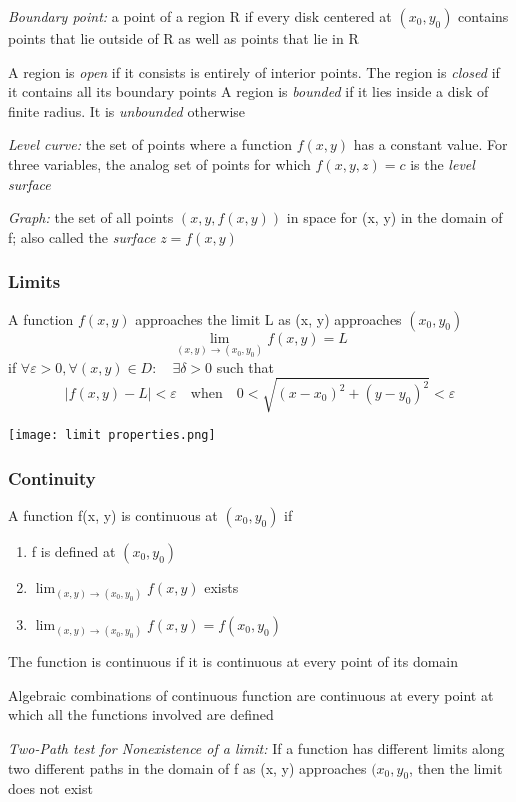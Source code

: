 \documentclass[12pt]{article}
\begin{document}
\emph{Boundary point:} a point of a region R if every disk centered at $(x_0, y_0)$ contains points that lie outside of R as well as points that lie in R

A region is \emph{open} if it consists is entirely of interior points. The region is \emph{closed} if it contains all its boundary points
A region is \emph{bounded} if it lies inside a disk of finite radius. It is \emph{unbounded} otherwise

\emph{Level curve:} the set of points where a function $f(x, y)$ has a constant value. For three variables, the analog set of points for which $f(x, y, z) = c$ is the \emph{level surface}

\emph{Graph:} the set of all points $(x, y, f(x, y))$ in space for (x, y) in the domain of f; also called the \emph{surface} $z = f(x, y)$

\subsubsection{Limits}
A function $f(x, y)$ approaches the limit L as (x, y) approaches $(x_0, y_0)$
\[ \lim_{(x, y) \to (x_0, y_0)} f(x,y) = L\]
if $\forall \varepsilon > 0, \forall (x, y) \in D: \quad \exists \delta > 0$ such that 
\[ |f(x,y) - L| < \varepsilon \quad \text{when} \quad 0 < \sqrt{(x - x_0)^2 + (y - y_0)^2} < \varepsilon\]

\texttt{[image: limit properties.png]}

\subsubsection{Continuity}
A function f(x, y) is continuous at $(x_0, y_0)$ if 
\begin{enumerate}
    \item f is defined at $(x_0, y_0)$
    \item $\lim_{(x, y) \to (x_0, y_0)} f(x,y)$ exists
    \item $\lim_{(x, y) \to (x_0, y_0)} f(x,y) = f(x_0, y_0)$
\end{enumerate}
The function is continuous if it is continuous at every point of its domain

Algebraic combinations of continuous function are continuous at every point at which all the functions involved are defined

\emph{Two-Path test for Nonexistence of a limit:}
If a function has different limits along two different paths in the domain of f as (x, y) approaches $(x_0, y_0$, then the limit does not exist
\end{document}
